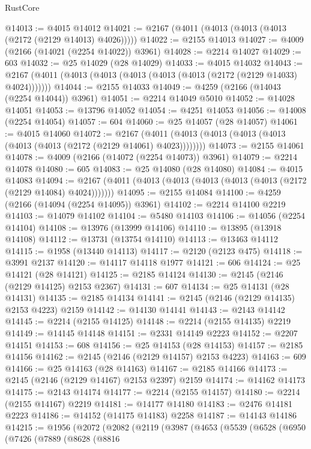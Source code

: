 \begin{lexlean}{RustCore}
\begin{coremodule}
@14013 := @4015 @14012
@14021 := @2167 (@4011 (@4013 (@4013 (@4013 (@2172 (@2129 @14013) @4026)))))
@14022 := @2155 @14013
@14027 := @4009 (@2166 (@14021 (@2254 @14022)) @3961)
@14028 := @2214 @14027
@14029 := 603
@14032 := @25 @14029 (@28 @14029)
@14033 := @4015 @14032
@14043 := @2167 (@4011 (@4013 (@4013 (@4013 (@4013 (@4013 (@2172 (@2129 @14033) @4024)))))))
@14044 := @2155 @14033
@14049 := @4259 (@2166 (@14043 (@2254 @14044)) @3961)
@14051 := @2214 @14049 @5010
@14052 := @14028 @14051
@14053 := @13796 @14052
@14054 := @4251 @14053
@14056 := @14008 (@2254 @14054)
@14057 := 604
@14060 := @25 @14057 (@28 @14057)
@14061 := @4015 @14060
@14072 := @2167 (@4011 (@4013 (@4013 (@4013 (@4013 (@4013 (@4013 (@2172 (@2129 @14061) @4023))))))))
@14073 := @2155 @14061
@14078 := @4009 (@2166 (@14072 (@2254 @14073)) @3961)
@14079 := @2214 @14078
@14080 := 605
@14083 := @25 @14080 (@28 @14080)
@14084 := @4015 @14083
@14094 := @2167 (@4011 (@4013 (@4013 (@4013 (@4013 (@4013 (@2172 (@2129 @14084) @4024)))))))
@14095 := @2155 @14084
@14100 := @4259 (@2166 (@14094 (@2254 @14095)) @3961)
@14102 := @2214 @14100 @2219
@14103 := @14079 @14102
@14104 := @5480 @14103
@14106 := @14056 (@2254 @14104)
@14108 := @13976 (@13999 @14106)
@14110 := @13895 (@13918 @14108)
@14112 := @13731 (@13754 @14110)
@14113 := @13463 @14112
@14115 := @1958 (@13440 @14113)
@14117 := @2120 (@2123 @475)
@14118 := @3991 @2137
@14120 := @14117 @14118 @1977
@14121 := 606
@14124 := @25 @14121 (@28 @14121)
@14125 := @2185 @14124
@14130 := @2145 (@2146 (@2129 @14125) @2153 @2367)
@14131 := 607
@14134 := @25 @14131 (@28 @14131)
@14135 := @2185 @14134
@14141 := @2145 (@2146 (@2129 @14135) @2153 @4223) @2159
@14142 := @14130 @14141
@14143 := @2143 @14142
@14145 := @2214 (@2155 @14125)
@14148 := @2214 (@2155 @14135) @2219
@14149 := @14145 @14148
@14151 := @2331 @14149 @2223
@14152 := @2207 @14151
@14153 := 608
@14156 := @25 @14153 (@28 @14153)
@14157 := @2185 @14156
@14162 := @2145 (@2146 (@2129 @14157) @2153 @4223)
@14163 := 609
@14166 := @25 @14163 (@28 @14163)
@14167 := @2185 @14166
@14173 := @2145 (@2146 (@2129 @14167) @2153 @2397) @2159
@14174 := @14162 @14173
@14175 := @2143 @14174
@14177 := @2214 (@2155 @14157)
@14180 := @2214 (@2155 @14167) @2219
@14181 := @14177 @14180
@14183 := @2476 @14181 @2223
@14186 := @14152 (@14175 @14183) @2258
@14187 := @14143 @14186
@14215 := @1956
    (@2072
      (@2082
        (@2119
          (@3987
            (@4653
              (@5539
                (@6528
                  (@6950
                    (@7426
                      (@7889
                        (@8628
                          (@8816

\end{coremodule}
\end{lexlean}

